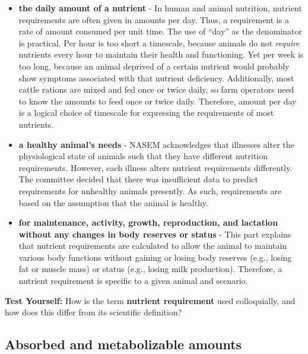 \documentclass[
]{book}
\begin{document}
\begin{itemize}
\item
  \textbf{the daily amount of a nutrient} - In human and animal nutrition, nutrient requirements are often given in amounts per day. Thus, a requirement is a rate of amount consumed per unit time. The use of ``day'' as the denominator is practical. Per hour is too short a timescale, because animals do not \emph{require} nutrients every hour to maintain their health and functioning. Yet per week is too long, because an animal deprived of a certain nutrient would probably show symptoms associated with that nutrient deficiency. Additionally, most cattle rations are mixed and fed once or twice daily, so farm operators need to know the amounts to feed once or twice daily. Therefore, amount per day is a logical choice of timescale for expressing the requirements of most nutrients.
\item
  \textbf{a healthy animal's needs} - NASEM \citeyearpar{NASEM8} acknowledges that illnesses alter the physiological state of animals such that they have different nutrition requirements. However, each illness alters nutrient requirements differently. The committee decided that there was insufficient data to predict requirements for unhealthy animals presently. As such, requirements are based on the assumption that the animal is healthy.
\item
  \textbf{for maintenance, activity, growth, reproduction, and lactation without any changes in body reserves or status} - This part explains that nutrient requirements are calculated to allow the animal to maintain various body functions without gaining or losing body reserves (e.g., losing fat or muscle mass) or status (e.g., losing milk production). Therefore, a nutrient requirement is specific to a given animal and scenario.
\end{itemize}

\textbf{Test Yourself: }
How is the term \textbf{nutrient requirement} used colloquially, and how does this differ from its scientific definition?

\hypertarget{absorbed-and-metabolizable-amounts}{%
\subsection{Absorbed and metabolizable amounts}\label{absorbed-and-metabolizable-amounts}}
\end{document}
